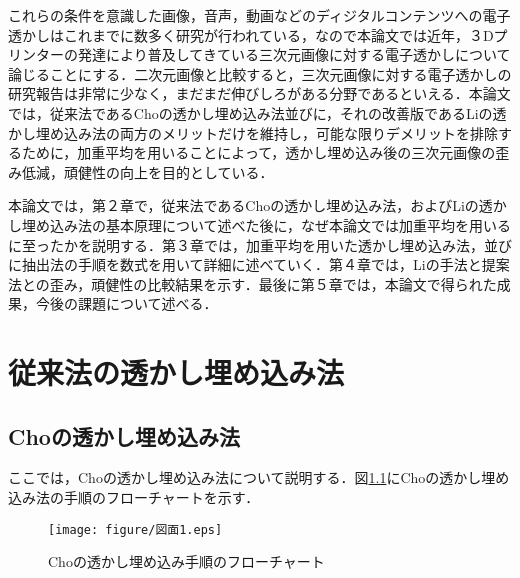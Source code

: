 \documentclass[11pt]{jreport}
\begin{document}
{これらの条件を意識した画像，音声，動画などのディジタルコンテンツへの電子透かしはこれまでに数多く研究が行われている，なので本論文では近年，３Dプリンターの発達により普及してきている三次元画像に対する電子透かしについて論じることにする．二次元画像と比較すると，三次元画像に対する電子透かしの研究報告は非常に少なく，まだまだ伸びしろがある分野であるといえる．本論文では，従来法であるChoの透かし埋め込み法\cite{Cho}並びに，それの改善版であるLiの透かし埋め込み法\cite{Li}の両方のメリットだけを維持し，可能な限りデメリットを排除するために，加重平均を用いることによって，透かし埋め込み後の三次元画像の歪み低減，頑健性の向上を目的としている．\par
本論文では，第２章で，従来法であるChoの透かし埋め込み法，およびLiの透かし埋め込み法の基本原理について述べた後に，なぜ本論文では加重平均を用いるに至ったかを説明する．第３章では，加重平均を用いた透かし埋め込み法，並びに抽出法の手順を数式を用いて詳細に述べていく．第４章では，Liの手法と提案法との歪み，頑健性の比較結果を示す．最後に第５章では，本論文で得られた成果，今後の課題について述べる．




















\chapter{従来法の透かし埋め込み法}
\section{Choの透かし埋め込み法}
ここでは，Choの透かし埋め込み法\cite{Cho}について説明する．図\ref{fig:sample}にChoの透かし埋め込み法の手順のフローチャートを示す．
\begin{figure}[htbp]
  \begin{center}
    \texttt{[image: figure/図面1.eps]}%
  \end{center}
  \caption{Choの透かし埋め込み手順のフローチャート}
  \label{fig:sample}
\end{figure}
\newpage





}
\end{document}
